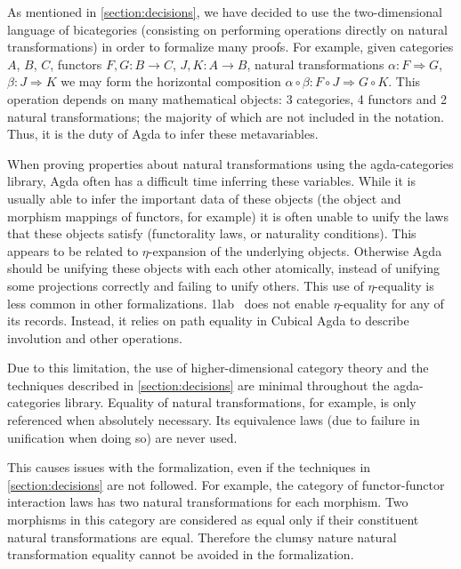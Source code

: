 \documentclass{amsart}
\theoremstyle{remark}
\begin{document}
As mentioned in \cref{section:decisions}, we have decided to use the two-dimensional language of bicategories (consisting on performing operations directly on natural transformations) in order to formalize many proofs. For example, given categories $A$, $B$, $C$, functors $F, G\colon B\to C$, $J, K\colon A\to B$, natural transformations $\alpha\colon F\Rightarrow G$, $\beta\colon J\Rightarrow K$ we may form the horizontal composition $\alpha\circ\beta\colon F\circ J\Rightarrow G\circ K$. This operation depends on many mathematical objects: 3 categories, 4 functors and 2 natural transformations; the majority of which are not included in the notation. Thus, it is the duty of Agda to infer these metavariables.

When proving properties about natural transformations using the agda-categories library, Agda often has a difficult time inferring these variables. While it is usually able to infer the important data of these objects (the object and morphism mappings of functors, for example) it is often unable to unify the laws that these objects satisfy (functorality laws, or naturality conditions). This appears to be related to $\eta$-expansion of the underlying objects. Otherwise Agda should be unifying these objects with each other atomically, instead of unifying some projections correctly and failing to unify others. This use of $\eta$-equality is less common in other formalizations. 1lab~\cite{agda:1lab} does not enable $\eta$-equality for any of its records. Instead, it relies on path equality in Cubical Agda to describe involution and other operations.

Due to this limitation, the use of higher-dimensional category theory and the techniques described in \cref{section:decisions} are minimal throughout the agda-categories library. Equality of natural transformations, for example, is only referenced when absolutely necessary. Its equivalence laws (due to failure in unification when doing so) are never used.

This causes issues with the formalization, even if the techniques in \cref{section:decisions} are not followed. For example, the category of functor-functor interaction laws has two natural transformations for each morphism. Two morphisms in this category are considered as equal only if their constituent natural transformations are equal. Therefore the clumsy nature natural transformation equality cannot be avoided in the formalization.
\end{document}
